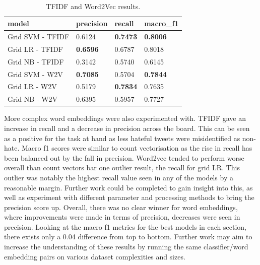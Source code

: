 \documentclass[conference]{IEEEtran}
\begin{document}
\begin{table}[H]
\centering
\begin{tabular}{|l|l|l|l|}
\hline
    model   & precision   & recall & macro\_f1     \\ \hline
Grid SVM - TFIDF &	0.6124 &	\textbf{0.7473} &	\textbf{0.8006}\\
Grid LR	- TFIDF  & \textbf{0.6596} &	0.6787 &	0.8018\\
Grid NB	- TFIDF & 0.3142 &	0.5740 &	0.6145\\ \hline

Grid SVM - W2V &	\textbf{0.7085} &	0.5704 &	\textbf{0.7844}\\
Grid LR - W2V &	0.5179 &	\textbf{0.7834} &	0.7635\\
Grid NB - W2V &	0.6395 &	0.5957 &	0.7727\\ \hline
\end{tabular}
\caption{\label{tab:TFIDF-results}\\ TFIDF and Word2Vec results.}
\end{table}

More complex word embeddings were also experimented with. TFIDF gave an increase in recall and a decrease in precision across the board. This can be seen as a positive for the task at hand as less hateful tweets were misidentified as non-hate. Macro f1 scores were similar to count vectorisation as the rise in recall has been balanced out by the fall in precision. Word2vec tended to perform worse overall than count vectors bar one outlier result, the recall for grid LR. This outlier was notably the highest recall value seen in any of the models by a reasonable margin. Further work could be completed to gain insight into this, as well as experiment with different parameter and processing methods to bring the precision score up. 
Overall, there was no clear winner for word embeddings, where improvements were made in terms of precision, decreases were seen in precision. Looking at the macro f1 metrics for the best models in each section, there exists only a 0.04 difference from top to bottom. Further work may aim to increase the understanding of these results by running the same classifier/word embedding pairs on various dataset complexities and sizes.
\end{document}
